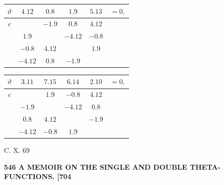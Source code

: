 \documentclass[11pt]{article}
\begin{document}
{\smallskip
\begin{center}
\begin{tabular}{c|cccc|c}\hline
$\vartheta$ & $4.12$ & $0.8$ & $1.9$ & $5.13$ & $=0,$\\\hline
$c$ & & $-1.9$ & $0.8$ & $4.12$ & \\
& $1.9$ & & $-4.12$ & $-0.8$ & \\
& $-0.8$ & $4.12$ & & $1.9$ & \\
& $-4.12$ & $0.8$ & $-1.9$ & & \\\hline
\end{tabular}
\hspace{0.8em}
\begin{tabular}{c|cccc|c}\hline
$\vartheta$ & $3.11$ & $7.15$ & $6.14$ & $2.10$ & $=0,$\\\hline
$c$ & & $1.9$ & $-0.8$ & $4.12$ & \\
& $-1.9$ & & $-4.12$ & $0.8$ & \\
& $0.8$ & $4.12$ & & $-1.9$ & \\
& $-4.12$ & $-0.8$ & $1.9$ & & \\\hline
\end{tabular}
\end{center}
}

\medskip
\hfill C. X. \hfill 69

\newpage
\noindent\textbf{546 \hfill A MEMOIR ON THE SINGLE AND DOUBLE THETA-FUNCTIONS. \hfill [704}
\end{document}
